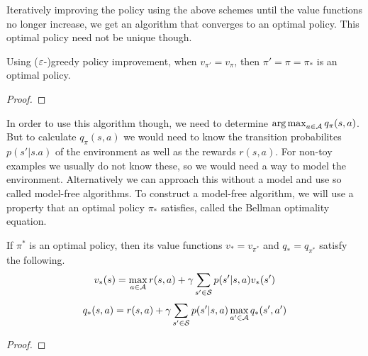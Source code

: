 Iteratively improving the policy using the above schemes until the value functions no longer increase, we get an algorithm that converges to an optimal policy. This optimal policy need not be unique though.

\begin{proposition}
    Using ($\varepsilon$-)greedy policy improvement, when $v_{\pi'} = v_\pi$, then $\pi' = \pi = \pi_*$ is an optimal policy.
\end{proposition}
\begin{proof}
    \todo
\end{proof}

In order to use this algorithm though, we need to determine $\operatorname*{arg\,max}_{a \in \mathcal{A}} q_\pi(s, a)$. But to calculate $q_\pi(s,a)$ we would need to know the transition probabilites $p(s' | s. a)$ of the environment as well as the rewards $r(s,a)$. For non-toy examples we usually do not know these, so we would need a way to model the environment. Alternatively we can approach this without a model and use so called model-free algorithms.
To construct a model-free algorithm, we will use a property that an optimal policy $\pi_*$ satisfies, called the Bellman optimality equation.

\begin{proposition}
    If $\pi^*$ is an optimal policy, then its value functions $v_* = v_{\pi^*}$ and $q_* = q_{\pi^*}$ satisfy the following.
    $$v_*(s) = \max_{a \in \mathcal{A}} r(s,a) + \gamma \sum_{s' \in \mathcal{S}} p(s'|s,a) v_*(s')$$
    $$q_*(s, a) = r(s,a) + \gamma \sum_{s' \in \mathcal{S}} p(s' | s, a) \max_{a' \in \mathcal{A}} q_*(s', a')$$
\end{proposition}
\begin{proof}
    \todo
\end{proof}


